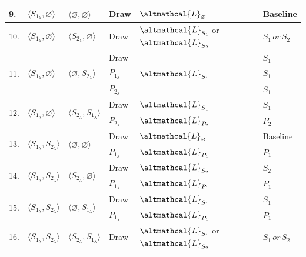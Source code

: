 \begin{table}[t]
\begin{threeparttable}
\begin{tabular}{lp{2.3cm}p{2.3cm}p{2cm}p{2cm}p{2.5cm}}
        9. & $\langle S_{1_{\lambda}}, \varnothing \rangle$ & $\langle \varnothing, \varnothing \rangle$ & Draw & $\altmathcal{L}_{\varnothing}$ & Baseline \\ \hline
        10. & $\langle S_{1_{\lambda}}, \varnothing \rangle$ & $\langle S_{2_{\lambda}}, \varnothing \rangle$ & Draw & $\altmathcal{L}_{S_1}$ or $\altmathcal{L}_{S_2}$ & $S_{1}\,or\, S_2$ \\ \hline
        \multirow{3}{*}{11.} & \multirow{3}{*}{$\langle S_{1_{\lambda}}, \varnothing \rangle$} & \multirow{3}{*}{$\langle \varnothing, S_{2_{\lambda}} \rangle$} & Draw & \multirow{3}{*}{$\altmathcal{L}_{S_1}$} & $S_1$\\
        & & & $P_{1_{\lambda}}$ & & $S_1$\\
        & & & $P_{2_{\lambda}}$ & & $S_1$\\ \hline
        \multirow{2}{*}{12.} & \multirow{2}{*}{$\langle S_{1_{\lambda}}, \varnothing \rangle$} & \multirow{2}{*}{$\langle S_{2_{\lambda}}, S_{1_{\lambda}} \rangle$} & Draw & $\altmathcal{L}_{S_1}$  & $S_1$\\
        & & & $P_{2_{\lambda}}$ & $\altmathcal{L}_{P_2}$ & $P_2$ \\ \hline
        \multirow{2}{*}{13.} & \multirow{2}{*}{$\langle S_{1_{\lambda}}, S_{2_{\lambda}} \rangle$} & \multirow{2}{*}{$\langle \varnothing, \varnothing \rangle$} & Draw & $\altmathcal{L}_{\varnothing}$  & Baseline\\
        & & & $P_{1_{\lambda}}$ & $\altmathcal{L}_{P_1}$ & $P_1$ \\ \hline
        \multirow{2}{*}{14.} & \multirow{2}{*}{$\langle S_{1_{\lambda}}, S_{2_{\lambda}} \rangle$} & \multirow{2}{*}{$\langle S_{2_{\lambda}}, \varnothing \rangle$} & Draw & $\altmathcal{L}_{S_2}$ & $S_2$\\
        & & & $P_{1_{\lambda}}$ & $\altmathcal{L}_{P_1}$  & $P_1$ \\ \hline
        \multirow{2}{*}{15.} & \multirow{2}{*}{$\langle S_{1_{\lambda}}, S_{2_{\lambda}} \rangle$} & \multirow{2}{*}{$\langle \varnothing, S_{1_{\lambda}} \rangle$} & Draw & $\altmathcal{L}_{S_1}$ & $S_1$\\
        & & & $P_{1_{\lambda}}$ & $\altmathcal{L}_{P_1}$ & $P_1$\\ \hline
        \multirow{3}{*}{16.} & \multirow{3}{*}{$\langle S_{1_{\lambda}}, S_{2_{\lambda}} \rangle$} & \multirow{3}{*}{$\langle S_{2_{\lambda}}, S_{1_{\lambda}} \rangle$} & Draw & $\altmathcal{L}_{S_1}$ or $\altmathcal{L}_{S_2}$ & $S_{1}\,or\, S_2$ \\

\end{tabular}
\end{threeparttable}
\end{table}
